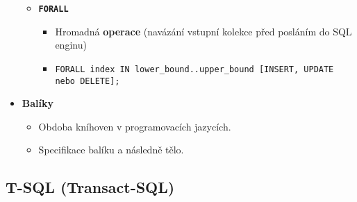 \begin{itemize}
\begin{itemize}
\item \textbf{\texttt{FORALL}}
\begin{itemize}
\item Hromadná \textbf{operace} (navázání vstupní kolekce před posláním do SQL enginu)
\item \texttt{FORALL index IN lower\_bound..upper\_bound [INSERT, UPDATE nebo DELETE];}
\end{itemize}
\end{itemize}



\item\textbf{Balíky}
\begin{itemize}
\item Obdoba kníhoven v programovacích jazycích.
\item Specifikace balíku a následně tělo. 
\end{itemize}


\end{itemize}






\subsection{T-SQL (Transact-SQL)}
